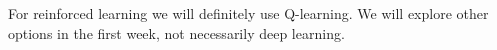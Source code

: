 For reinforced learning we will definitely use Q-learning. We will explore
other options in the first week, not necessarily deep learning.
